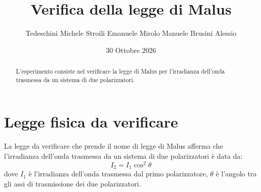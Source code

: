 \documentclass[10pt,twocolumn]{article}
\begin{document}
    \justifying 

      \title{\textbf{Verifica della legge di Malus}}
      \author{Tedeschini Michele \hspace{0.7cm} Stroili Emanuele \hspace{0.7cm} Mirolo Manuele \hspace{0.7cm} Brusini Alessio} 
      \date{30 Ottobre 2026}
      \maketitle
      \onecolumn
      \tableofcontents
    \vspace{3cm}
      \begin{abstract}
        \centering
        \large
        L'esperimento consiste nel verificare la legge di Malus per l'irradianza dell'onda trasmessa da un sistema di due  polarizzatori. 
          
      \end{abstract}

      \newpage
    \restoregeometry
    \twocolumn



    \section{Legge fisica da verificare}
    La legge da verificare che prende il nome di legge di Malus afferma che l'irradianza dell'onda trasmessa da un sistema di due polarizzatori è data da: 
  \begin{equation}
        I_2 = I_1 \cos^2 \theta
    \end{equation}
    dove $I_1$ è l'irradianza dell'onda trasmessa dal primo polarizzatore, $\theta$ è l'angolo tra gli assi di trasmissione dei due polarizzatori.
\end{document}
